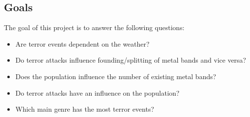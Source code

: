 \subsection{Goals}
The goal of this project is to answer the following questions:
\begin{itemize}
	\item Are terror events dependent on the weather?
	\item Do terror attacks influence founding/splitting of metal bands and vice versa?
	\item Does the population influence the number of existing metal bands?
	\item Do terror attacks have an influence on the population?
	\item Which main genre has the most terror events?
\end{itemize}

